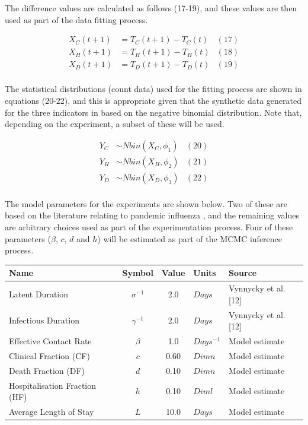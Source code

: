\documentclass[10pt,letterpaper]{article}
\begin{document}
The difference values are calculated as follows (17-19), and these values are then used as part of the data fitting process.

\begin{align*}
X_{C}(t+1)  & = T_{C}(t+1) - T_{C}(t)  &  (17)\\
X_{H}(t+1)  & = T_{H}(t+1) - T_{H}(t)   & (18)\\
X_{D}(t+1)  & = T_{D}(t+1) - T_{D}(t)   & (19)\\
\end{align*}

The statistical distributions (count data) used for the fitting process are shown in equations (20-22), and this is appropriate given that the synthetic data generated for the three indicators in based on the negative binomial distribution. Note that, depending on the experiment, a subset of these will be used.

\begin{align*}
Y_{C}  &  \sim Nbin(X_{C},\phi_{1})  &  (20) \\
Y_{H}  &  \sim Nbin(X_{H},\phi_{2})  &  (21) \\
Y_{D}  &  \sim Nbin(X_{D},\phi_{3})  &  (22) \\
\end{align*}

The model parameters for the experiments are shown below. Two of these are based on the literature relating to pandemic influenza \citep{vynnycky2008analyses}, and the remaining values are arbitrary choices used as part of the experimentation process. Four of these parameters (\(\beta\), \(c\), \(d\) and \(h\)) will be estimated as part of the MCMC inference process.

\begin{center}  
\begin{tabular}{ | l | c | c | l | l |} %
\hline  
Name & Symbol & Value  & Units & Source \\ \hline  
Latent Duration & $\sigma^{-1}$ & 2.0 & $Days$ & Vynnycky et al. [12]\\ \hline  
Infectious Duration & $\gamma^{-1}$ & 2.0 & $Days$ & Vynnycky et al. [12]\\ \hline  
Effective Contact Rate & $\beta$ & 1.0 & $Days^{-1}$ & Model estimate\\ \hline  
Clinical Fraction (CF)& $c$ & 0.60 & $Dimn$ & Model estimate\\ \hline  
Death Fraction (DF) & $d$ & 0.10 & $Dimn$ & Model estimate\\ \hline 
Hospitalisation Fraction (HF) & $h$ & 0.10 & $Diml$ & Model estimate\\ \hline 
Average Length of Stay & $L$ & 10.0 & $Days$ & Model estimate\\ \hline 
\end{tabular}  
\end{center}
\end{document}
